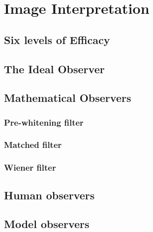 \documentclass[mphy386-notes.tex]{subfiles}
\begin{document}
\section{Image Interpretation}
\subsection{Six levels of Efficacy}
\subsection{The Ideal Observer}
\subsection{Mathematical Observers}
\subsubsection{Pre-whitening filter}
\subsubsection{Matched filter}
\subsubsection{Wiener filter}
\subsection{Human observers}
\subsection{Model observers}
\pagebreak
\end{document}
